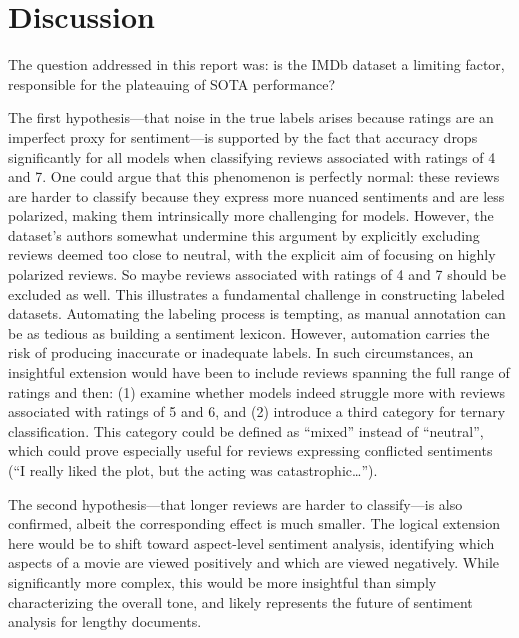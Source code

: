 \documentclass{article}
\begin{document}
\section{Discussion}

The question addressed in this report was: is the IMDb dataset a limiting factor, responsible for the plateauing of SOTA performance?

The first hypothesis---that noise in the true labels arises because ratings are an imperfect proxy for sentiment---is supported by the fact that accuracy drops significantly for all models when classifying reviews associated with ratings of 4 and 7. One could argue that this phenomenon is perfectly normal: these reviews are harder to classify because they express more nuanced sentiments and are less polarized, making them intrinsically more challenging for models. However, the dataset’s authors somewhat undermine this argument by explicitly excluding reviews deemed too close to neutral, with the explicit aim of focusing on highly polarized reviews. So maybe reviews associated with ratings of 4 and 7 should be excluded as well. This illustrates a fundamental challenge in constructing labeled datasets. Automating the labeling process is tempting, as manual annotation can be as tedious as building a sentiment lexicon. However, automation carries the risk of producing inaccurate or inadequate labels. In such circumstances, an insightful extension would have been to include reviews spanning the full range of ratings and then: (1) examine whether models indeed struggle more with reviews associated with ratings of 5 and 6, and (2) introduce a third category for ternary classification. This category could be defined as \enquote{mixed} instead of \enquote{neutral}, which could prove especially useful for reviews expressing conflicted sentiments (\enquote{I really liked the plot, but the acting was catastrophic…}).

The second hypothesis---that longer reviews are harder to classify---is also confirmed, albeit the corresponding effect is much smaller. The logical extension here would be to shift toward aspect-level sentiment analysis, identifying which aspects of a movie are viewed positively and which are viewed negatively. While significantly more complex, this would be more insightful than simply characterizing the overall tone, and likely represents the future of sentiment analysis for lengthy documents.



\end{document}
